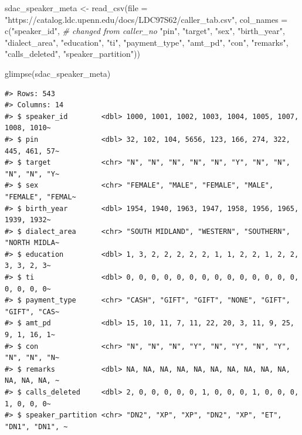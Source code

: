 \documentclass[
  letterpaper,
]{scrbook}
\newenvironment{Shaded}{\begin{snugshade}}{\end{snugshade}}
\newcommand{\AttributeTok}[1]{\textcolor[rgb]{0.00,0.00,0.00}{#1}}
\newcommand{\CommentTok}[1]{\textcolor[rgb]{0.00,0.00,0.00}{\textit{#1}}}
\newcommand{\FunctionTok}[1]{\textcolor[rgb]{0.00,0.00,0.00}{#1}}
\newcommand{\NormalTok}[1]{\textcolor[rgb]{0.00,0.00,0.00}{#1}}
\newcommand{\OtherTok}[1]{\textcolor[rgb]{0.00,0.00,0.00}{#1}}
\newcommand{\StringTok}[1]{\textcolor[rgb]{0.00,0.00,0.00}{#1}}
\begin{document}
\begin{Shaded}
\begin{Highlighting}[]
\NormalTok{sdac\_speaker\_meta }\OtherTok{\textless{}{-}} 
  \FunctionTok{read\_csv}\NormalTok{(}\AttributeTok{file =} \StringTok{"https://catalog.ldc.upenn.edu/docs/LDC97S62/caller\_tab.csv"}\NormalTok{, }
           \AttributeTok{col\_names =} \FunctionTok{c}\NormalTok{(}\StringTok{"speaker\_id"}\NormalTok{, }\CommentTok{\# changed from \textasciigrave{}caller\_no\textasciigrave{}}
                         \StringTok{"pin"}\NormalTok{,}
                         \StringTok{"target"}\NormalTok{,}
                         \StringTok{"sex"}\NormalTok{,}
                         \StringTok{"birth\_year"}\NormalTok{,}
                         \StringTok{"dialect\_area"}\NormalTok{,}
                         \StringTok{"education"}\NormalTok{,}
                         \StringTok{"ti"}\NormalTok{,}
                         \StringTok{"payment\_type"}\NormalTok{,}
                         \StringTok{"amt\_pd"}\NormalTok{,}
                         \StringTok{"con"}\NormalTok{,}
                         \StringTok{"remarks"}\NormalTok{,}
                         \StringTok{"calls\_deleted"}\NormalTok{,}
                         \StringTok{"speaker\_partition"}\NormalTok{))}

\FunctionTok{glimpse}\NormalTok{(sdac\_speaker\_meta)}
\end{Highlighting}
\end{Shaded}

\begin{verbatim}
#> Rows: 543
#> Columns: 14
#> $ speaker_id        <dbl> 1000, 1001, 1002, 1003, 1004, 1005, 1007, 1008, 1010~
#> $ pin               <dbl> 32, 102, 104, 5656, 123, 166, 274, 322, 445, 461, 57~
#> $ target            <chr> "N", "N", "N", "N", "N", "Y", "N", "N", "N", "N", "Y~
#> $ sex               <chr> "FEMALE", "MALE", "FEMALE", "MALE", "FEMALE", "FEMAL~
#> $ birth_year        <dbl> 1954, 1940, 1963, 1947, 1958, 1956, 1965, 1939, 1932~
#> $ dialect_area      <chr> "SOUTH MIDLAND", "WESTERN", "SOUTHERN", "NORTH MIDLA~
#> $ education         <dbl> 1, 3, 2, 2, 2, 2, 2, 1, 1, 2, 2, 1, 2, 2, 3, 3, 2, 3~
#> $ ti                <dbl> 0, 0, 0, 0, 0, 0, 0, 0, 0, 0, 0, 0, 0, 0, 0, 0, 0, 0~
#> $ payment_type      <chr> "CASH", "GIFT", "GIFT", "NONE", "GIFT", "GIFT", "CAS~
#> $ amt_pd            <dbl> 15, 10, 11, 7, 11, 22, 20, 3, 11, 9, 25, 9, 1, 16, 1~
#> $ con               <chr> "N", "N", "N", "Y", "N", "Y", "N", "Y", "N", "N", "N~
#> $ remarks           <dbl> NA, NA, NA, NA, NA, NA, NA, NA, NA, NA, NA, NA, NA, ~
#> $ calls_deleted     <dbl> 2, 0, 0, 0, 0, 0, 1, 0, 0, 0, 1, 0, 0, 0, 1, 0, 0, 0~
#> $ speaker_partition <chr> "DN2", "XP", "XP", "DN2", "XP", "ET", "DN1", "DN1", ~
\end{verbatim}
\end{document}
